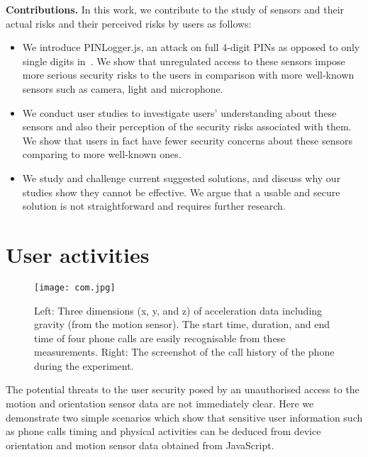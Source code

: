 \documentclass[10pt,twocolumn]{article}
\begin{document}
\textbf{Contributions.} In this work, we contribute to the study of sensors and their actual risks and their perceived risks by users as follows: 


\begin{itemize}
\item We introduce PINLogger.js, an attack on full 4-digit PINs as opposed to only single digits in~\cite{Mehrnezhad}. We show that unregulated access to these sensors impose more serious security risks to the users in comparison with more well-known sensors such as camera, light and microphone. 

\item We conduct user studies to investigate users' understanding about these sensors and also their perception of the security risks associated with them. We show that users in fact have fewer security concerns about these sensors comparing to more well-known ones. 

\item We study and challenge current suggested solutions, and discuss why our studies show they cannot be effective. We argue that a usable and secure solution is not straightforward and requires further research. 
\end{itemize}
\section{User activities} 
\label{activity}
\begin{figure*}[t]
	\centering
	\texttt{[image: com.jpg]}
	\caption{Left: Three dimensions (x, y, and z) of acceleration data including gravity (from the motion sensor). The start time, duration, and end time of four phone calls are easily recognisable from these measurements.
		Right: The screenshot of the call history of the phone during the experiment.}
	\label{call}
\end{figure*}
The potential threats to the user security posed by an unauthorised access to the motion and orientation sensor data are not immediately clear. 
Here we demonstrate two simple scenarios which show that
sensitive user information such as phone calls timing and physical activities can be deduced from device orientation and motion sensor data obtained from JavaScript.
\end{document}
